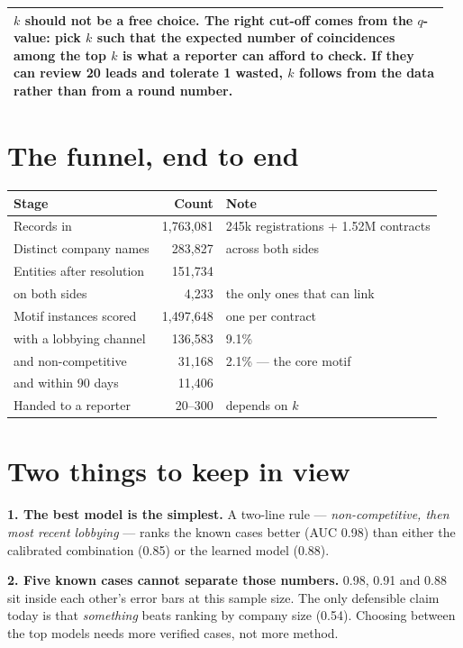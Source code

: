 \documentclass[11pt,a4paper]{article}
\makeatletter
\newenvironment{keybox}{\par\vspace{0.3em}\noindent
  \begin{tabular}{|@{\hspace{9pt}}p{0.955\linewidth}@{\hspace{9pt}}|}\hline
  \rule{0pt}{1.1em}}{\\[0.5em]\hline\end{tabular}\par\vspace{0.3em}}
\makeatother
\begin{document}
\begin{keybox}
\textbf{$k$ should not be a free choice.} The right cut-off comes from the $q$-value: pick
$k$ such that the expected number of coincidences among the top $k$ is what a reporter can
afford to check. If they can review 20 leads and tolerate 1 wasted, $k$ follows from the
data rather than from a round number.
\end{keybox}

\section*{The funnel, end to end}

\begin{center}\small
\begin{tabular}{@{}lrl@{}}
\toprule
\textbf{Stage} & \textbf{Count} & \textbf{Note} \\
\midrule
Records in                       & 1{,}763{,}081 & 245k registrations + 1.52M contracts \\
Distinct company names           & 283{,}827 & across both sides \\
Entities after resolution        & 151{,}734 & \\
\quad on both sides              & 4{,}233 & the only ones that can link \\
Motif instances scored           & 1{,}497{,}648 & one per contract \\
\quad with a lobbying channel    & 136{,}583 & 9.1\% \\
\quad and non-competitive        & 31{,}168 & 2.1\% --- the core motif \\
\quad and within 90 days         & 11{,}406 & \\
Handed to a reporter             & 20--300 & depends on $k$ \\
\bottomrule
\end{tabular}
\end{center}

\section*{Two things to keep in view}

\textbf{1. The best model is the simplest.} A two-line rule --- \emph{non-competitive,
then most recent lobbying} --- ranks the known cases better (AUC 0.98) than either the
calibrated combination (0.85) or the learned model (0.88).

\textbf{2. Five known cases cannot separate those numbers.} 0.98, 0.91 and 0.88 sit inside
each other's error bars at this sample size. The only defensible claim today is that
\emph{something} beats ranking by company size (0.54). Choosing between the top models
needs more verified cases, not more method.
\end{document}
